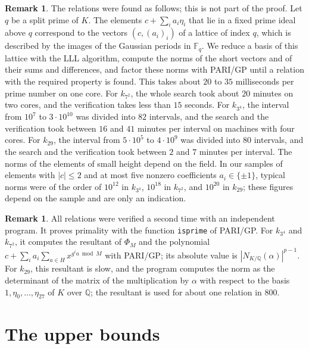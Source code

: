 \documentclass[11pt]{amsart}
\theoremstyle{plain}
\theoremstyle{definition}
\newtheorem{remark}[theorem]{Remark}
\begin{document}
\begin{remark} \label{rem:search}
The relations were found as follows; this is not part of the proof.
Let $q$ be a split prime of $K$.
The elements $c + \sum_i a_i \eta_i$ that lie in a fixed prime ideal above $q$ correspond to the vectors $(c, (a_i)_i)$ of a lattice of index $q$, which is described by the images of the Gaussian periods in $\mathbb{F}_q$.
We reduce a basis of this lattice with the LLL algorithm, compute the norms of the short vectors and of their sums and differences, and factor these norms with PARI/GP \cite{PARI} until a relation with the required property is found.
This takes about $20$ to $35$ milliseconds per prime number on one core.
For $k_{7^2}$, the whole search took about $20$ minutes on two cores, and the verification takes less than $15$ seconds.
For $k_{3^4}$, the interval from $10^7$ to $3 \cdot 10^{10}$ was divided into $82$ intervals, and the search and the verification took between $16$ and $41$ minutes per interval on machines with four cores.
For $k_{29}$, the interval from $5 \cdot 10^5$ to $4 \cdot 10^9$ was divided into $80$ intervals, and the search and the verification took between $2$ and $7$ minutes per interval.
The norms of the elements of small height depend on the field.
In our samples of elements with $|c| \le 2$ and at most five nonzero coefficients $a_i \in \{\pm 1\}$, typical norms were of the order of $10^{12}$ in $k_{3^4}$, $10^{18}$ in $k_{7^2}$, and $10^{20}$ in $k_{29}$; these figures depend on the sample and are only an indication.
\end{remark}

\begin{remark} \label{rem:second}
All relations were verified a second time with an independent program.
It proves primality with the function \texttt{isprime} of PARI/GP.
For $k_{3^4}$ and $k_{7^2}$, it computes the resultant of $\Phi_M$ and the polynomial $c + \sum_i a_i \sum_{a \in H} x^{g^i a \bmod M}$ with PARI/GP; its absolute value is $|N_{K/\mathbb{Q}}(\alpha)|^{p-1}$.
For $k_{29}$, this resultant is slow, and the program computes the norm as the determinant of the matrix of the multiplication by $\alpha$ with respect to the basis $1, \eta_0, \ldots, \eta_{27}$ of $K$ over $\mathbb{Q}$; the resultant is used for about one relation in $800$.
\end{remark}

\section{The upper bounds} \label{sec:bound}
\end{document}
